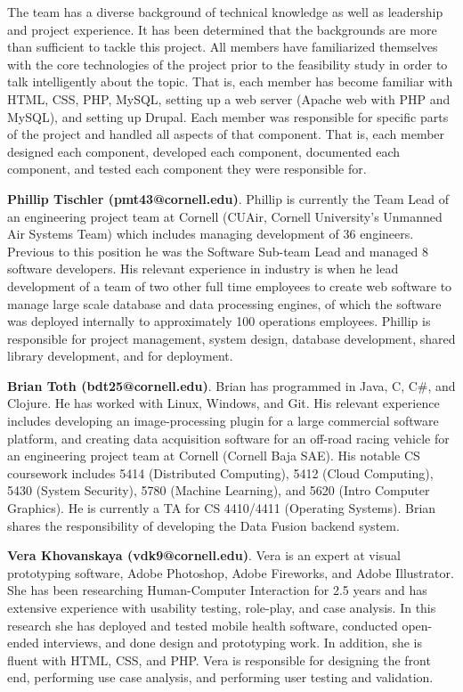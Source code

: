 \documentclass[11pt]{article} %
\begin{document}
The team has a diverse background of technical knowledge as well as leadership and project experience. It has been determined that the backgrounds are more than sufficient to tackle this project. All members have familiarized themselves with the core technologies of the project prior to the feasibility study in order to talk intelligently about the topic. That is, each member has become familiar with HTML, CSS, PHP, MySQL, setting up a web server (Apache web with PHP and MySQL), and setting up Drupal. Each member was responsible for specific parts of the project and handled all aspects of that component. That is, each member designed each component, developed each component, documented each component, and tested each component they were responsible for.

\textbf{Phillip Tischler (pmt43@cornell.edu)}. Phillip is currently the Team Lead of an engineering project team at Cornell (CUAir, Cornell University’s Unmanned Air Systems Team) which includes managing development of 36 engineers. Previous to this position he was the Software Sub-team Lead and managed 8 software developers. His relevant experience in industry is when he lead development of a team of two other full time employees to create web software to manage large scale database and data processing engines, of which the software was deployed internally to approximately 100 operations employees. Phillip is responsible for project management, system design, database development, shared library development, and for deployment.

\textbf{Brian Toth (bdt25@cornell.edu)}. Brian has programmed in Java, C, C\#, and Clojure. He has worked with Linux, Windows, and Git. His relevant experience includes developing an image-processing plugin for a large commercial software platform, and creating data acquisition software for an off-road racing vehicle for an engineering project team at Cornell (Cornell Baja SAE). His notable CS coursework includes 5414 (Distributed Computing), 5412 (Cloud Computing), 5430 (System Security), 5780 (Machine Learning), and 5620 (Intro Computer Graphics). He is currently a TA for CS 4410/4411 (Operating Systems). Brian shares the responsibility of developing the Data Fusion backend system. 

\textbf{Vera Khovanskaya (vdk9@cornell.edu)}. Vera is an expert at visual prototyping software, Adobe Photoshop, Adobe Fireworks, and Adobe Illustrator. She has been researching Human-Computer Interaction for 2.5 years and has extensive experience with usability testing, role-play, and case analysis. In this research she has deployed and tested mobile health software, conducted open-ended interviews, and done design and prototyping work. In addition, she is fluent with HTML, CSS, and PHP. Vera is responsible for designing the front end, performing use case analysis, and performing user testing and validation. 
\end{document}
